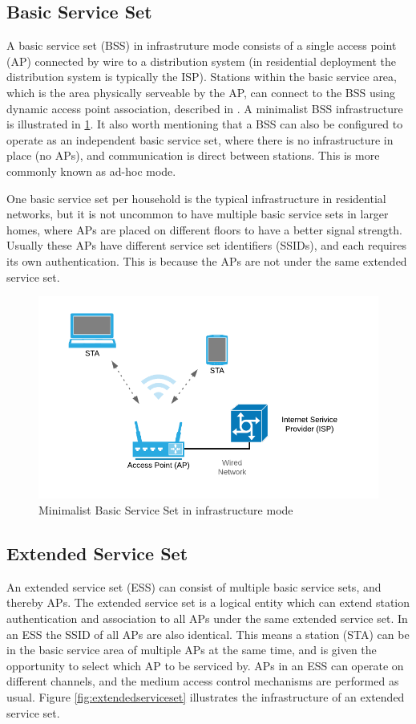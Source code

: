 		\subsection{Basic Service Set}
		A basic service set (BSS) in infrastruture mode consists of a single access point (AP) connected by wire to a distribution system (in residential deployment the distribution system is typically the ISP).
		Stations within the basic service area, which is the area physically serveable by the AP, can connect to the BSS using dynamic access point association, described
		in \cite{std80211}. A minimalist BSS infrastructure is illustrated in \ref{fig:basicserviceset}. It also worth mentioning that a BSS can also be configured to operate as an independent
		basic service set, where there is no infrastructure in place (no APs), and communication is direct between stations. This is more commonly known as ad-hoc mode.
		
		One basic service set per household is the typical infrastructure in residential networks, but it is not uncommon to have multiple basic service sets in larger homes,
		where APs are placed on different floors to have a better signal strength. Usually these APs have different service set identifiers (SSIDs), and each requires its own authentication.
		This is because the APs are not under the same extended service set. 

		 \begin{figure}
			 \center
			 \includegraphics[scale=1]{Images/BSS.png}
			 \caption{Minimalist Basic Service Set in infrastructure mode}
			 \label{fig:basicserviceset}
		 \end{figure}

		\subsection{Extended Service Set}
		An extended service set (ESS) can consist of multiple basic service sets, and thereby APs. The extended service set is a logical entity which can extend station
		authentication and association to all APs under the same extended service set. In an ESS the SSID of all APs are also identical. This means a station (STA) can be in the basic service area of
		multiple APs at the same time, and is given the opportunity to select which AP to be serviced by. APs in an ESS can operate on different channels, and the medium access control
		mechanisms are performed as usual. Figure \ref{fig:extendedserviceset} illustrates the infrastructure of an extended service set.  

